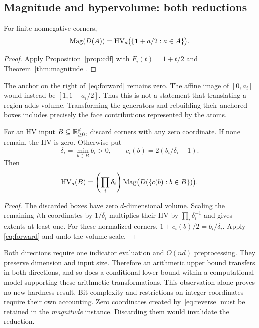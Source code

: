 \subsection{Magnitude and hypervolume: both reductions}
\label{sec:reductions}

\begin{corollary}[Magnitude to HV]\label{cor:mag-to-hv}
For finite nonnegative corners,
\begin{equation}
 \operatorname{Mag}(D(A))=\operatorname{HV}_d\bigl(\{\mathbf 1+a/2:a\in A\}\bigr).
 \label{eq:forward}
\end{equation}
\end{corollary}
\begin{proof}
Apply Proposition~\ref{prop:cdf} with $F_i(t)=1+t/2$ and
Theorem~\ref{thm:magnitude}.
\end{proof}

The anchor on the right of~\eqref{eq:forward} remains zero. The affine
image of $[0,a_i]$ would instead be $[1,1+a_i/2]$. Thus this is not a
statement that translating a region adds volume. Transforming the
generators and rebuilding their anchored boxes includes precisely the
face contributions represented by the atoms.

\begin{proposition}[HV to magnitude]\label{prop:reverse}
For an HV input $B\subseteq\mathbb R_{\ge0}^d$, discard corners with any zero
coordinate. If none remain, the HV is zero. Otherwise put
\[
 \delta_i=\min_{b\in B}b_i>0,
 \qquad c_i(b)=2(b_i/\delta_i-1).
\]
Then
\begin{equation}
 \operatorname{HV}_d(B)=\left(\prod_i\delta_i\right)
                 \operatorname{Mag}\bigl(D(\{c(b):b\in B\})\bigr).
 \label{eq:reverse}
\end{equation}
\end{proposition}
\begin{proof}
The discarded boxes have zero $d$-dimensional volume. Scaling the
remaining $i$th coordinates by $1/\delta_i$ multiplies their HV by
$\prod_i\delta_i^{-1}$ and gives extents at least one. For these
normalized corners, $1+c_i(b)/2=b_i/\delta_i$. Apply
\eqref{eq:forward} and undo the volume scale.
\end{proof}

Both directions require one indicator evaluation and $O(nd)$ preprocessing.
They preserve dimension and input size. Therefore an arithmetic upper
bound transfers in both directions, and so does a conditional lower bound
within a computational model supporting these arithmetic transformations.
This observation alone proves no new hardness result. Bit complexity and
restrictions on integer coordinates require their own accounting.
Zero coordinates created by~\eqref{eq:reverse} must be retained in the
\emph{magnitude} instance. Discarding them would invalidate the reduction.

